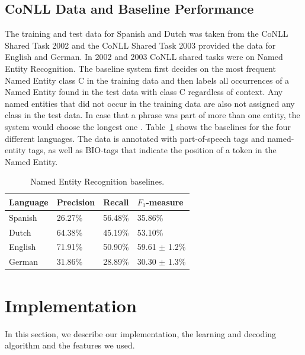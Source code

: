 \documentclass[11pt]{article}
\begin{document}
\subsection{CoNLL Data and Baseline Performance}
The training and test data for Spanish and Dutch was taken from the CoNLL Shared Task 2002 \cite{tksintro} and 
the CoNLL Shared Task 2003 \cite{TjongKimSang:2003:ICS:1119176.1119195} provided the data for English and German.
In 2002 and 2003 CoNLL shared tasks were on Named Entity Recognition. The baseline system first decides on the most frequent Named Entity class C in the training data
and then labels all occurrences of a Named Entity found in the test data with class C regardless of context. 
Any named entities that did not occur in the training data are also not assigned any class in the test data.
In case that a phrase was part of more than one entity, the system would choose the longest one \cite{TjongKimSang:2003:ICS:1119176.1119195}.
Table~\ref{table:Base} shows the baselines for the four different languages.  
The data is annotated with part-of-speech tags and named-entity tags, as well as BIO-tags that indicate the position of a token in the Named Entity. %


\begin{table}[h!]
\small
\begin{tabular}{|l|l|l|l|}
\hline
\bf Language & \bf Precision & \bf Recall & \bf $F_1$-measure \\ \hline
Spanish &             26.27\% & 56.48\% & 35.86\%        \\
Dutch  &             64.38\%  &45.19\%    & 53.10\%  \\
English &              71.91\%& 50.90\%  & 59.61 $\pm$ 1.2\%\\
German &      31.86\%  & 28.89\% & 30.30  $\pm$ 1.3\% \\
\hline
\end{tabular}
\caption{Named Entity Recognition baselines.}
\label{table:Base}
\end{table}



\section{Implementation}
In this section, we describe our implementation, the learning and decoding algorithm and the features we used.
\end{document}
